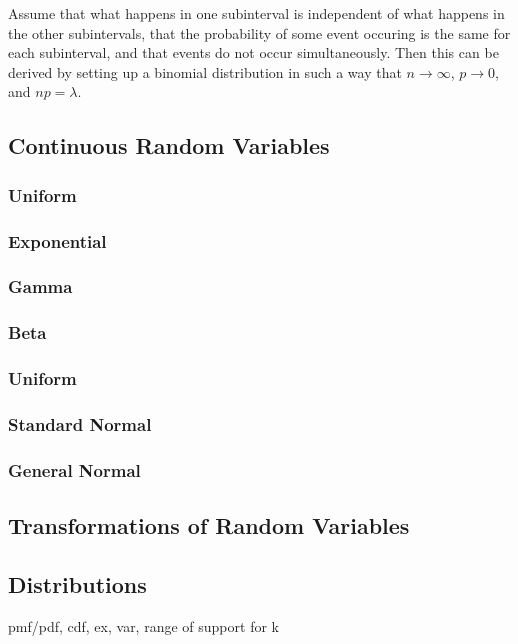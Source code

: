 \documentclass[a4paper,10pt]{article}
\begin{document}
Assume that what happens in one subinterval is independent of what happens in the other subintervals, that the probability of some event occuring is the same for each subinterval, and that events do not occur simultaneously. Then this can be derived by setting up a binomial distribution in such a way that $n \to \infty$, $p\to 0$, and $np=\lambda$. 

\subsection{Continuous Random Variables}

\subsubsection{Uniform}

\subsubsection{Exponential}

\subsubsection{Gamma}

\subsubsection{Beta}

\subsubsection{Uniform}

\subsubsection{Standard Normal}

\subsubsection{General Normal}

\subsection{Transformations of Random Variables}

\subsection{Distributions}
pmf/pdf, cdf, ex, var, range of support for k
\end{document}
